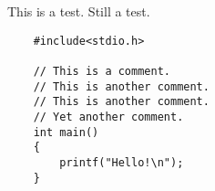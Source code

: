 \documentclass{article}
\begin{document}
This is a test. Still a test.
\begin{lstlisting}
    #include<stdio.h>

    // This is a comment.
    // This is another comment.
    // This is another comment.
    // Yet another comment.
    int main()
    {
        printf("Hello!\n");
    }
\end{lstlisting}
\end{document}
